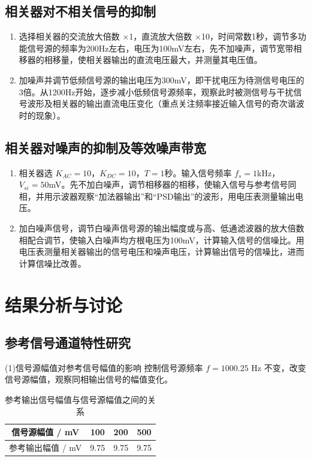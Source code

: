\documentclass[12pt,a4paper]{article}
\begin{document}
\subsection{相关器对不相关信号的抑制}

\begin{enumerate}
    \item 选择相关器的交流放大倍数 $\times$1，直流放大倍数 $\times$10，时间常数1秒，调节多功能信号源的频率为200Hz左右，电压为100mV左右，先不加噪声，调节宽带相移器的相移量，使相关器输出的直流电压最大，并测量其电压值。
    \item 加噪声并调节低频信号源的输出电压为300mV，即干扰电压为待测信号电压的3倍。从1200Hz开始，逐步减小低频信号源频率，观察此时被测信号与干扰信号波形及相关器的输出直流电压变化（重点关注频率接近输入信号的奇次谐波时的现象）。
\end{enumerate}

\subsection{相关器对噪声的抑制及等效噪声带宽}

\begin{enumerate}
    \item 相关器选 $K_{AC}=10$，$K_{DC}=10$，$T=1$秒。输入信号频率 $f_s=1$kHz，$V_{si}=50$mV。先不加白噪声，调节相移器的相移，使输入信号与参考信号同相，并用示波器观察“加法器输出”和“PSD输出”的波形，用电压表测量输出电压。
    \item 加白噪声信号，调节白噪声信号源的输出幅度或与高、低通滤波器的放大倍数相配合调节，使输入白噪声均方根电压为100mV，计算输入信号的信噪比。用电压表测量相关器输出的信号电压和噪声电压，计算输出信号的信噪比，进而计算信噪比改善。
\end{enumerate}
\section{结果分析与讨论}
\subsection{参考信号通道特性研究}
(1)信号源幅值对参考信号幅值的影响
控制信号源频率 $f = 1000.25$ Hz 不变，改变信号源幅值，观察同相输出信号的幅值变化。

\begin{table}[h]
    \centering
    \caption{参考输出信号幅值与信号源幅值之间的关系}
    \begin{tabular}{cccc}
        \toprule
        信号源幅值 / mV & 100 & 200 & 500  \\
        \midrule
        参考输出幅值 / mV & 9.75 & 9.75 & 9.75  \\
        \bottomrule
    \end{tabular}
\end{table}
\end{document}
